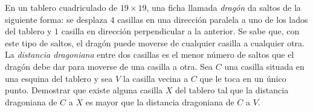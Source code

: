 En un tablero cuadriculado de $19 \times 19$, una ficha llamada \emph{dragón} da saltos de la siguiente forma: se desplaza $4$ casillas en una dirección paralela a uno de los lados del tablero y $1$ casilla en dirección perpendicular a la anterior. Se sabe que, con este tipo de saltos, el dragón puede moverse de cualquier casilla a cualquier otra. La \emph{distancia dragoniana} entre dos casillas es el menor número de saltos que el dragón debe dar para moverse de una casilla a otra. \newline 
Sea $C$ una casilla situada en una esquina del tablero y sea $V$ la casilla vecina a $C$ que le toca en un único punto. Demostrar que existe alguna casilla $X$ del tablero tal que la distancia dragoniana de $C$ a $X$ es mayor que la distancia dragoniana de $C$ a $V$.

